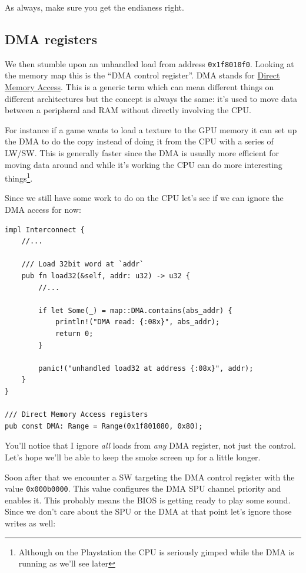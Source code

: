 \documentclass[a4paper]{article}
\newcommand{\code}[1] {\texttt{#1}}
\begin{document}
As always, make sure you get the endianess right.

\subsection{DMA registers}

We then stumble upon an unhandled load from address
\code{0x1f8010f0}. Looking at the memory map this is the ``DMA control
register''. DMA stands for
\href{https://en.wikipedia.org/wiki/Direct_memory_access}{Direct
  Memory Access}. This is a generic term which can mean different
things on different architectures but the concept is always the same:
it's used to move data between a peripheral and RAM without directly
involving the CPU.

For instance if a game wants to load a texture to the GPU memory it
can set up the DMA to do the copy instead of doing it from the CPU
with a series of LW/SW. This is generally faster since the DMA is
usually more efficient for moving data around and while it's working
the CPU can do more interesting things\footnote{Although on the
  Playstation the CPU is seriously gimped while the DMA is running as
  we'll see later}.

Since we still have some work to do on the CPU let's see if we can
ignore the DMA access for now:

\begin{lstlisting}
impl Interconnect {
    //...

    /// Load 32bit word at `addr`
    pub fn load32(&self, addr: u32) -> u32 {
        //...

        if let Some(_) = map::DMA.contains(abs_addr) {
            println!("DMA read: {:08x}", abs_addr);
            return 0;
        }

        panic!("unhandled load32 at address {:08x}", addr);
    }
}

/// Direct Memory Access registers
pub const DMA: Range = Range(0x1f801080, 0x80);
\end{lstlisting}

You'll notice that I ignore \emph{all} loads from \emph{any} DMA
register, not just the control. Let's hope we'll be able to keep the
smoke screen up for a little longer.

Soon after that we encounter a SW targeting the DMA control register
with the value \code{0x000b0000}. This value configures the DMA SPU
channel priority and enables it. This probably means the BIOS is
getting ready to play some sound. Since we don't care about the SPU or
the DMA at that point let's ignore those writes as well:
\end{document}
